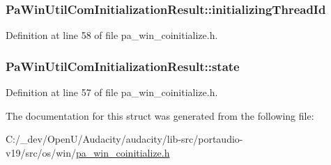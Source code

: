 \subsubsection[{\texorpdfstring{initializing\+Thread\+Id}{initializingThreadId}}]{ Pa\+Win\+Util\+Com\+Initialization\+Result\+::initializing\+Thread\+Id}\hypertarget{struct_pa_win_util_com_initialization_result_a4523b33a8dd63e34ad278769ec882237}{}\label{struct_pa_win_util_com_initialization_result_a4523b33a8dd63e34ad278769ec882237}


Definition at line 58 of file pa\+\_\+win\+\_\+coinitialize.\+h.

\subsubsection[{\texorpdfstring{state}{state}}]{ Pa\+Win\+Util\+Com\+Initialization\+Result\+::state}\hypertarget{struct_pa_win_util_com_initialization_result_aebe3fcf1b606a3280125c8caae68fb44}{}\label{struct_pa_win_util_com_initialization_result_aebe3fcf1b606a3280125c8caae68fb44}


Definition at line 57 of file pa\+\_\+win\+\_\+coinitialize.\+h.



The documentation for this struct was generated from the following file\+:\begin{DoxyCompactItemize}
\item 
C\+:/\+\_\+dev/\+Open\+U/\+Audacity/audacity/lib-\/src/portaudio-\/v19/src/os/win/\hyperlink{pa__win__coinitialize_8h}{pa\+\_\+win\+\_\+coinitialize.\+h}\end{DoxyCompactItemize}
